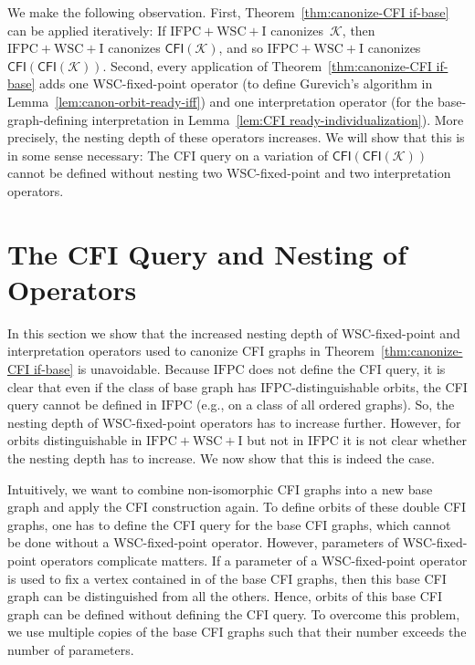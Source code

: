 \documentclass[]{lmcs}
\newcommand{\GraphClass}{\mathcal{K}}
\newcommand{\IFPC}{\ensuremath{\mathrm{IFPC}}}
\newcommand{\IFPCWSCI}{\ensuremath{\mathrm{IFPC{+}WSC{+}I}}}
\newcommand{\CFIsym}{\mathsf{CFI}}
\newcommand{\CFI}[1]{\CFIsym(#1)}
\begin{document}
We make the following observation.
First, Theorem~\ref{thm:canonize-CFI if-base} can be applied iteratively:
If \IFPCWSCI{} canonizes~$\GraphClass$,
then \IFPCWSCI{} canonizes $\CFI{\GraphClass}$,
and so \IFPCWSCI{} canonizes $\CFI{\CFI{\GraphClass}}$.
Second, every application of Theorem~\ref{thm:canonize-CFI if-base}
adds one WSC-fixed-point operator (to define Gurevich's algorithm in Lemma~\ref{lem:canon-orbit-ready-iff})
and one interpretation operator (for the base-graph-defining interpretation in Lemma~\ref{lem:CFI ready-individualization}).
More precisely, the nesting depth of these operators increases.
We will show that this is in some sense necessary:
The CFI query on a variation of $\CFI{\CFI{\GraphClass}}$
cannot be defined without nesting two WSC-fixed-point and two interpretation operators.


\section{The CFI Query and Nesting of Operators}
\label{sec:nesting-of-operators}

In this section we show that the increased nesting depth of WSC-fixed-point
and interpretation operators used to canonize CFI graphs
in Theorem~\ref{thm:canonize-CFI if-base} is unavoidable.
Because \IFPC{} does not define the CFI query,
it is clear that even if the class of base graph has \IFPC{}-distinguishable orbits,
the CFI query cannot be defined in \IFPC{}
(e.g., on a class of all ordered graphs).
So, the nesting depth of WSC-fixed-point operators has to increase further.
However, for orbits distinguishable in \IFPCWSCI{} but not in \IFPC{}
it is not clear whether the nesting depth has to increase.
We now show that this is indeed the case.

Intuitively, we want to combine non-isomorphic CFI graphs
into a new base graph and apply the CFI construction again.
To define orbits of these double CFI graphs,
one has to define the CFI query for the base CFI graphs,
which cannot be done without a WSC-fixed-point operator.
However, parameters of WSC-fixed-point operators complicate matters.
If a parameter of a WSC-fixed-point operator is used to 
fix a vertex contained in of the base CFI graphs,
then this base CFI graph can be distinguished from all the others.
Hence, orbits of this base CFI graph can be defined without defining the CFI query.
To overcome this problem, we use multiple copies of the base CFI graphs
such that their number exceeds the number of parameters.
\end{document}
